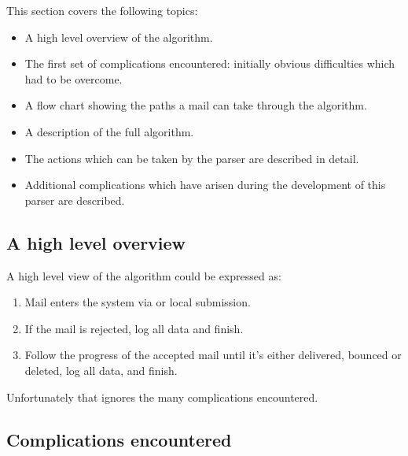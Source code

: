 \documentclass[a4paper,12pt,draft]{article}
\begin{document}
This section covers the following topics:

\begin{itemize}

    \item A high level overview of the algorithm.

    \item The first set of complications encountered: initially obvious
        difficulties which had to be overcome.

    \item A flow chart showing the paths a mail can take through the
        algorithm.

    \item A description of the full algorithm.

    \item The actions which can be taken by the parser are described in
        detail.

    \item Additional complications which have arisen during the development
        of this parser are described.

\end{itemize}

\subsection{A high level overview}

A high level view of the algorithm could be expressed as:

\begin{enumerate}

    \item Mail enters the system via \SMTP{} or local submission.

    \item If the mail is rejected, log all data and finish.

    \item Follow the progress of the accepted mail until it's either
        delivered, bounced or deleted, log all data, and finish.

\end{enumerate}

Unfortunately that ignores the many complications encountered.


\subsection{Complications encountered}
\end{document}
